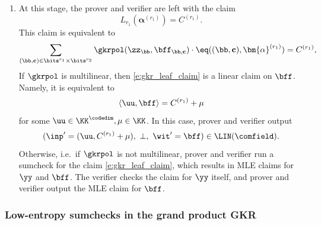 \begin{construction}
\begin{enumerate}[leftmargin=*]
\begin{enumerate}[leftmargin=*]
    \end{enumerate}
    \item At this stage, the prover and verifier are left with the claim
    $$
    L_{r_1}(\bm{\alpha}^{(r_1)}) = C^{(r_1)}.
    $$
    This claim is equivalent to
    \begin{equation}\label{e:gkr_leaf_claim}
    \sum_{(\bb,\cc)\in \bits^{r_1} \times \bits^{r_2}} \gkrpol(\zz_{\bb},\bff_{\bb,\cc}) \cdot \eq((\bb,\cc), \bm{\alpha}^{(r_1)}) = C^{(r_1)},
    \end{equation}
    If $\gkrpol$ is multilinear, then \eqref{e:gkr_leaf_claim} is a linear claim on $\bff$. Namely, it is equivalent to
    $$
    \langle \uu, \bff \rangle = C^{(r_1)} + \mu
    $$
    for some $\uu\in \KK^{\codedim}, \mu\in \KK$. In this case, prover and verifier output 
        $$
    (\inp'=(\uu, C^{(r_1)}+\mu),\ \bot, \ \wit' = \bff) \in \LIN(\comfield).
    $$
    Otherwise, i.e.\ if $\gkrpol$ is not multilinear, prover and verifier run a sumcheck for the claim \eqref{e:gkr_leaf_claim}, which results in MLE claims for $\yy$ and $\bff$. The verifier checks the claim for $\yy$ itself, and prover and verifier output the MLE claim for $\bff$.
\end{enumerate}
    
\end{construction}

\subsubsection{Low-entropy sumchecks in the \ftwoz grand product GKR}


